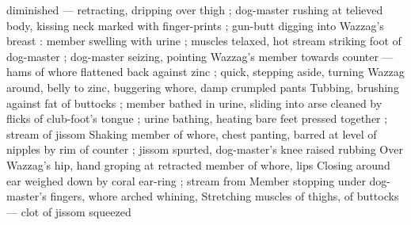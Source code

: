 diminished --- retracting, dripping over thigh ; dog-master rushing at 
telieved body, kissing neck marked with finger-prints ; gun-butt 
digging into Wazzag's breast : member swelling with urine ; muscles 
telaxed, hot stream striking foot of dog-master ; dog-master seizing, 
pointing Wazzag's member towards counter --- hams of whore 
flattened back against zinc ; quick, stepping aside, turning Wazzag 
around, belly to zinc, buggering whore, damp crumpled pants 
Tubbing, brushing against fat of buttocks ; member bathed in urine, 
sliding into arse cleaned by flicks of club-foot's tongue ; urine 
bathing, heating bare feet pressed together ; stream of jissom 
Shaking member of whore, chest panting, barred at level of nipples 
by rim of counter ; jissom spurted, dog-master's knee raised rubbing 
Over Wazzag's hip, hand groping at retracted member of whore, lips 
Closing around ear weighed down by coral ear-ring ; stream from 
Member stopping under dog-master's fingers, whore arched whining, 
Stretching muscles of thighs, of buttocks --- clot of jissom squeezed 

